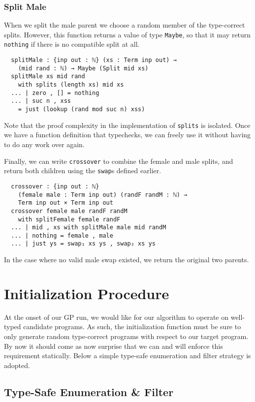 \documentclass[runningheads,a4paper]{llncs}
\begin{document}
\subsubsection{Split Male}

When we split the male parent we choose a random member of the
type-correct splits. However, this function returns a value of type
\texttt{Maybe}, so that it may return \texttt{nothing} if there is no
compatible split at all.

\begin{verbatim}
  splitMale : {inp out : ℕ} (xs : Term inp out) →
    (mid rand : ℕ) → Maybe (Split mid xs)
  splitMale xs mid rand
    with splits (length xs) mid xs
  ... | zero , [] = nothing
  ... | suc n , xss
    = just (lookup (rand mod suc n) xss)
\end{verbatim}

Note that the proof complexity in the implementation of
\texttt{splits} is isolated. Once we have a function definition that
typechecks, we can freely use it without having to do any work over
again.

Finally, we can write \texttt{crossover} to combine the female and
male splits, and return both children using the \texttt{swap}s defined
earlier.

\begin{verbatim}
  crossover : {inp out : ℕ}
    (female male : Term inp out) (randF randM : ℕ) →
    Term inp out × Term inp out
  crossover female male randF randM
    with splitFemale female randF
  ... | mid , xs with splitMale male mid randM
  ... | nothing = female , male
  ... | just ys = swap₁ xs ys , swap₂ xs ys
\end{verbatim}

In the case where no valid male swap existed, we return the original
two parents.

\section{Initialization Procedure}

At the onset of our GP run, we would like for our algorithm to operate
on well-typed candidate programs. As such, the initialization function
must be sure to only generate random type-correct programs with
respect to our target program. By now it should come as now
surprise that we can and will enforce this requirement
statically. Below a simple type-safe enumeration and filter strategy
is adopted.

\subsection{Type-Safe Enumeration \& Filter}
\end{document}
